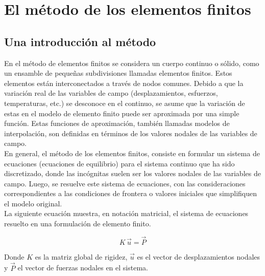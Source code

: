 
\section{El método de los elementos finitos}

\subsection{Una introducción al método}

En el método de elementos finitos se considera un cuerpo continuo o sólido, como un ensamble de pequeñas 
subdivisiones llamadas elementos finitos. Estos elementos están interconectados a través de nodos comunes. 
Debido a que la variación real de las variables de campo (desplazamientos, esfuerzos, temperaturas, etc.) 
se desconoce en el continuo, se asume que la variación de estas en el modelo de elemento finito puede ser 
aproximada por una simple función. Estas funciones de aproximación, también llamadas modelos de interpolación, 
son definidas en términos de los valores nodales de las variables de campo.\\

En general, el método de los elementos finitos, consiste en formular un sistema de ecuaciones 
(ecuaciones de equilibrio) para el sistema continuo que ha sido discretizado, donde las incógnitas 
suelen ser los valores nodales de las variables de campo. Luego, se resuelve este sistema de ecuaciones, 
con las consideraciones correspondientes a las condiciones de frontera o valores iniciales que simplifiquen 
el modelo original.\\ 

La siguiente ecuación muestra, en notación matricial, el sistema de ecuaciones resuelto 
en una formulación de elemento finito.

\begin{equation} \label{eq:fem_simple}
K\,\vec{u} = \vec{P}
\end{equation}

Donde $K$ es la matriz global de rigidez, $\vec{u}$ es el vector de desplazamientos nodales y $\vec{P}$ el 
vector de fuerzas nodales en el sistema. \\

